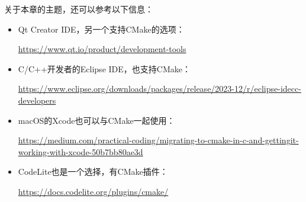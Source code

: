 关于本章的主题，还可以参考以下信息：

\begin{itemize}
\item
Qt Creator IDE，另一个支持CMake的选项：

\url{https://www.qt.io/product/development-tools}

\item
C/C++开发者的Eclipse IDE，也支持CMake：

\url{https://www.eclipse.org/downloads/packages/release/2023-12/r/eclipse-idecc-developers}

\item
macOS的Xcode也可以与CMake一起使用：

\url{https://medium.com/practical-coding/migrating-to-cmake-in-c-and-gettingit-working-with-xcode-50b7bb80ae3d}

\item
CodeLite也是一个选择，有CMake插件：

\url{https://docs.codelite.org/plugins/cmake/}
\end{itemize}
